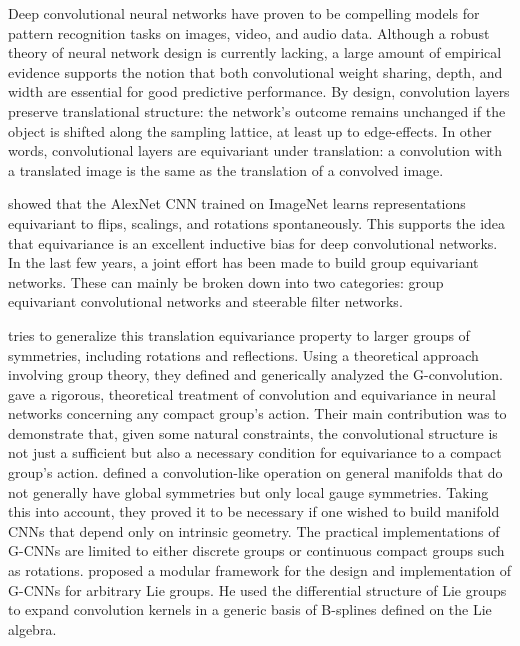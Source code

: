 \documentclass{article}
\begin{document}
Deep convolutional neural networks \citep{lecun1995convolutional} have proven to be compelling models for pattern recognition tasks on images, video, and audio data. Although a robust theory of neural network design is currently lacking, a large amount of empirical evidence supports the notion that both convolutional weight sharing, depth, and width are essential for good predictive performance. By design, convolution layers preserve translational structure: the network's outcome remains unchanged if the object is shifted along the sampling lattice, at least up to edge-effects. In other words, convolutional layers are equivariant under translation: a convolution with a translated image is the same as the translation of a convolved image.

\citet{lenc2015understanding} showed that the AlexNet CNN \citet{krizhevsky2012imagenet} trained on ImageNet learns representations equivariant to flips, scalings, and rotations spontaneously. This supports the idea that equivariance is an excellent inductive bias for deep convolutional networks. In the last few years, a joint effort has been made to build group equivariant networks. These can mainly be broken down into two categories: group equivariant convolutional networks and steerable filter networks. 

\citet{cohen2016gcnn} tries to generalize this translation equivariance property to larger groups of symmetries, including rotations and reflections. Using a theoretical approach involving group theory, they defined and generically analyzed the G-convolution. \citet{kondor2018generalization} gave a rigorous, theoretical treatment of convolution and equivariance in neural networks concerning any compact group's action. Their main contribution was to demonstrate that, given some natural constraints, the convolutional structure is not just a sufficient but also a necessary condition for equivariance to a compact group's action. \citet{cohen2019gauge} defined a convolution-like operation on general manifolds that do not generally have global symmetries but only local gauge symmetries. Taking this into account, they proved it to be necessary if one wished to build manifold CNNs that depend only on intrinsic geometry. The practical implementations of G-CNNs are limited to either discrete groups or continuous compact groups such as rotations. \citet{bekkers2019b} proposed a modular framework for the design and implementation of G-CNNs for arbitrary Lie groups. He used the differential structure of Lie groups to expand convolution kernels in a generic basis of B-splines defined on the Lie algebra.
\end{document}
